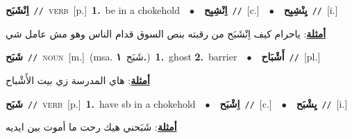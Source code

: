 \documentclass[10pt,a4paper,twoside]{article} %
\begin{document}
\begin{multicols}{2}
{\setlength\topsep{0pt}\textbf{\foreignlanguage{arabic}{اِنْشَبَح}}\ {\color{gray}\texttt{//}\color{black}}\ \textsc{verb}\ [p.]\ \textbf{1.}~be in a chokehold\ \ $\bullet$\ \ \setlength\topsep{0pt}\textbf{\foreignlanguage{arabic}{اِنْشِبِح}}\ {\color{gray}\texttt{//}\color{black}}\ [c.]\ \ $\bullet$\ \ \setlength\topsep{0pt}\textbf{\foreignlanguage{arabic}{يِنْشِبِح}}\ {\color{gray}\texttt{//}\color{black}}\ [i.]\  \begin{flushright}\color{gray}\foreignlanguage{arabic}{\textbf{\underline{\foreignlanguage{arabic}{أمثلة}}}: ياحرام كيف اِنْشَبَح من رقبته بنص السوق قدام الناس وهو مش عامل شي}\end{flushright}\color{black}} \vspace{2mm}

{\setlength\topsep{0pt}\textbf{\foreignlanguage{arabic}{شَبَح}}\ {\color{gray}\texttt{//}\color{black}}\ \textsc{noun}\ [m.]\ \color{gray}(msa. \foreignlanguage{arabic}{شَبَح}~\foreignlanguage{arabic}{\textbf{١.}})\color{black}\ \textbf{1.}~ghost  \textbf{2.}~barrier\ \ $\bullet$\ \ \setlength\topsep{0pt}\textbf{\foreignlanguage{arabic}{أَشْبَاح}}\ {\color{gray}\texttt{//}\color{black}}\ [pl.]\  \begin{flushright}\color{gray}\foreignlanguage{arabic}{\textbf{\underline{\foreignlanguage{arabic}{أمثلة}}}: هاي المدرسة زي بيت الأَشْباح}\end{flushright}\color{black}} \vspace{2mm}

{\setlength\topsep{0pt}\textbf{\foreignlanguage{arabic}{شَبَح}}\ {\color{gray}\texttt{//}\color{black}}\ \textsc{verb}\ [p.]\ \textbf{1.}~have sb in a chokehold\ \ $\bullet$\ \ \setlength\topsep{0pt}\textbf{\foreignlanguage{arabic}{اِشْبَح}}\ {\color{gray}\texttt{//}\color{black}}\ [c.]\ \ $\bullet$\ \ \setlength\topsep{0pt}\textbf{\foreignlanguage{arabic}{يِشْبَح}}\ {\color{gray}\texttt{//}\color{black}}\ [i.]\  \begin{flushright}\color{gray}\foreignlanguage{arabic}{\textbf{\underline{\foreignlanguage{arabic}{أمثلة}}}: شَبَحني هيك رحت ما أموت بين ايديه}\end{flushright}\color{black}} \vspace{2mm}


\end{multicols}
\end{document}
